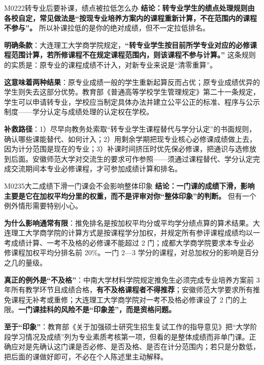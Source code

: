 \begin{qa}{M0222}{转专业后要补课，绩点被拉低怎么办}
\textbf{结论：转专业学生的绩点处理规则由各校自定，常见做法是“按现专业培养方案内的课程重新计算，不在范围内的课程不参与”。} 所以补课拉低的是你的绝对成绩，但不一定拉低排名。

\textbf{明确条款}：大连理工大学商学院规定，\textbf{“转专业学生按目前所学专业对应的必修课程范围计算，若所修课程不在规定课程范围内，则该课程不参与计算。”} 这条规则的实质是：原专业的课程成绩不计入，对新专业来说是“清零重算”。

\textbf{这意味着两种结果}：原专业成绩一般的学生重新起算反而占优；原专业成绩优异的学生则失去这部分优势。教育部《普通高等学校学生管理规定》第二十一条规定，学生可以申请转专业，学校应当制定具体办法并建立公平公正的标准、程序与公示制度——学分认定与成绩处理的认定权在学校。

\textbf{补救路径}：1）尽早向教务处索取“转专业学生课程替代与学分认定”的书面规则，确认哪些课能替代、如何计入；2）用剩余学期把现专业核心必修课成绩做上去，因为计分范围是现在的专业；3）补课时间挤压时优先保必修课，把通识与选修放到后面。安徽师范大学对交流生的要求可作参照——须通过课程替代、学分认定完成交流期间本专业必修课程，才可参加成绩计算和排名。
\end{qa}

\begin{qa}{M0235}{大二成绩下滑一门课会不会影响整体印象}
\textbf{结论：一门课的成绩下滑，影响主要是它在加权平均分里的权重，而不是评审对你“整体印象”的判断。} 但有一个例外情形需要特别小心。

\textbf{为什么影响通常有限}：推免排名是按加权平均分或平均学分绩点算的算术结果。大连理工大学商学院的计算方式是按课程学分加权，并规定所有参评课程成绩均以一考成绩计算、一考不及格的必修课不能超过 2 门；成都大学商学院要求本专业必修课程加权平均分排名前 20\%。一门 2—3 学分的课程，对总加权分的影响是百分之几的量级。

\textbf{真正的例外是“不及格”}：中南大学材料学院规定推免生必须完成专业培养方案前 3 年所有教学环节且成绩合格，\textbf{有不及格课程者不得推荐}；安徽师范大学要求所有推免课程无补考或重修；大连理工大学商学院对一考不及格必修课设了 2 门的上限。\textbf{一门课挂科的风险不是“印象差”，而是资格问题。}

\textbf{至于“印象”}：教育部《关于加强硕士研究生招生复试工作的指导意见》把“大学阶段学习情况及成绩”列为专业素质考核第一项，但看的是整体成绩而非单门课。正确应对是先确认这门课是否必修、是否及格、是否在计分范围内；若只是分数低，把后面的课做好即可，不必在个人陈述里主动解释。
\end{qa}

